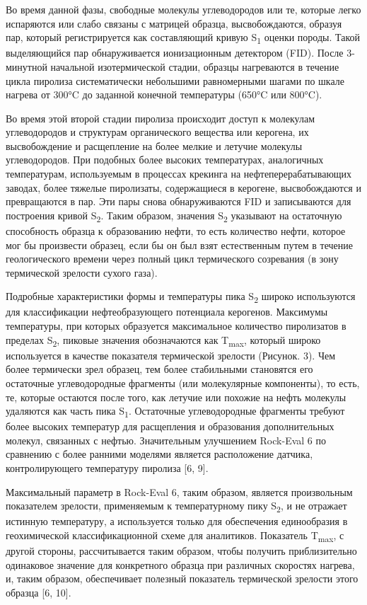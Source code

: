 \begin{multicols}{2}
Во время данной фазы, свободные молекулы углеводородов или те, которые
легко испаряются или слабо связаны с матрицей образца, высвобождаются,
образуя пар, который регистрируется как составляющий кривую
S\textsubscript{1} оценки породы. Такой выделяющийся пар обнаруживается
ионизационным детектором (FID). После 3-минутной начальной
изотермической стадии, образцы нагреваются в течение цикла пиролиза
систематически небольшими равномерными шагами по шкале нагрева от 300°C
до заданной конечной температуры (650°C или 800°C).

Во время этой второй стадии пиролиза происходит доступ к молекулам
углеводородов и структурам органического вещества или керогена, их
высвобождение и расщепление на более мелкие и летучие молекулы
углеводородов. При подобных более высоких температурах, аналогичных
температурам, используемым в процессах крекинга на нефтеперерабатывающих
заводах, более тяжелые пиролизаты, содержащиеся в керогене,
высвобождаются и превращаются в пар. Эти пары снова обнаруживаются FID и
записываются для построения кривой S\textsubscript{2}. Таким образом,
значения S\textsubscript{2} указывают на остаточную способность образца
к образованию нефти, то есть количество нефти, которое мог бы произвести
образец, если бы он был взят естественным путем в течение геологического
времени через полный цикл термического созревания (в зону термической
зрелости сухого газа).

Подробные характеристики формы и температуры пика S\textsubscript{2}
широко используются для классификации нефтеобразующего потенциала
керогенов. Максимумы температуры, при которых образуется максимальное
количество пиролизатов в пределах S\textsubscript{2}, пиковые значения
обозначаются как T\textsubscript{max}, который широко используется в
качестве показателя термической зрелости (Рисунок. 3). Чем более
термически зрел образец, тем более стабильными становятся его остаточные
углеводородные фрагменты (или молекулярные компоненты), то есть, те,
которые остаются после того, как летучие или похожие на нефть молекулы
удаляются как часть пика S\textsubscript{1}. Остаточные углеводородные
фрагменты требуют более высоких температур для расщепления и образования
дополнительных молекул, связанных с нефтью. Значительным улучшением
Rock-Eval 6 по сравнению с более ранними моделями является расположение
датчика, контролирующего температуру пиролиза {[}6, 9{]}.

Максимальный параметр в Rock-Eval 6, таким образом, является
произвольным показателем зрелости, применяемым к температурному пику
S\textsubscript{2}, и не отражает истинную температуру, а используется
только для обеспечения единообразия в геохимической классификационной
схеме для аналитиков. Показатель T\textsubscript{max}, с другой стороны,
рассчитывается таким образом, чтобы получить приблизительно одинаковое
значение для конкретного образца при различных скоростях нагрева, и,
таким образом, обеспечивает полезный показатель термической зрелости
этого образца {[}6, 10{]}.


\end{multicols}

